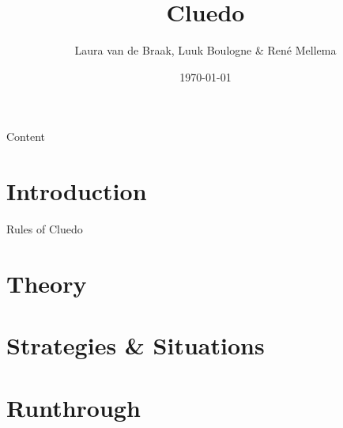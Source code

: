 \documentclass{beamer}
\title{Cluedo}
\author{Laura van de Braak, Luuk Boulogne \& Ren\'e Mellema}
\date{\today}
\begin{document}
\begin{frame}
    \titlepage
\end{frame}

\begin{frame}{Content}
  \tableofcontents
\end{frame}

\section{Introduction}

\begin{frame}{Rules of Cluedo}
  
\end{frame}

\section{Theory}


\section{Strategies \& Situations}


\section{Runthrough}

\end{document}
